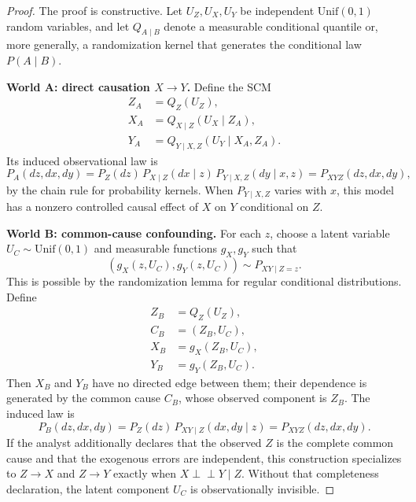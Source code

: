 \documentclass[12pt,a4paper]{article}
\begin{document}
\begin{proof}
\rigorFull
The proof is constructive.  Let $U_Z,U_X,U_Y$ be independent
$\mathrm{Unif}(0,1)$ random variables, and let
$Q_{A\mid B}$ denote a measurable conditional quantile or, more generally,
a randomization kernel that generates the conditional law $P(A\mid B)$.

\medskip\noindent
\textbf{World A: direct causation $X \to Y$.}
Define the SCM
\begin{align}
    Z_A &= Q_Z(U_Z), \nonumber\\
    X_A &= Q_{X\mid Z}(U_X \mid Z_A), \nonumber\\
    Y_A &= Q_{Y\mid X,Z}(U_Y \mid X_A,Z_A).
    \label{eq:scm_direct}
\end{align}
Its induced observational law is
\begin{equation}
    P_A(dz,dx,dy)
    = P_Z(dz)\,P_{X\mid Z}(dx\mid z)\,P_{Y\mid X,Z}(dy\mid x,z)
    = P_{XYZ}(dz,dx,dy),
    \label{eq:direct_law}
\end{equation}
by the chain rule for probability kernels.  When
$P_{Y\mid X,Z}$ varies with $x$, this model has a nonzero controlled
causal effect of $X$ on $Y$ conditional on $Z$.

\medskip\noindent
\textbf{World B: common-cause confounding.}
For each $z$, choose a latent variable $U_C \sim \mathrm{Unif}(0,1)$ and
measurable functions $g_X,g_Y$ such that
\begin{equation}
    (g_X(z,U_C),g_Y(z,U_C)) \sim P_{XY\mid Z=z}.
    \label{eq:common_cause_kernel}
\end{equation}
This is possible by the randomization lemma for regular conditional
distributions.  Define
\begin{align}
    Z_B &= Q_Z(U_Z), \nonumber\\
    C_B &= (Z_B,U_C), \nonumber\\
    X_B &= g_X(Z_B,U_C), \nonumber\\
    Y_B &= g_Y(Z_B,U_C).
    \label{eq:scm_confounding}
\end{align}
Then $X_B$ and $Y_B$ have no directed edge between them; their dependence
is generated by the common cause $C_B$, whose observed component is $Z_B$.
The induced law is
\begin{equation}
    P_B(dz,dx,dy)
    = P_Z(dz)\,P_{XY\mid Z}(dx,dy\mid z)
    = P_{XYZ}(dz,dx,dy).
    \label{eq:confounding_law}
\end{equation}
If the analyst additionally declares that the observed $Z$ is the complete
common cause and that the exogenous errors are independent, this construction
specializes to $Z \to X$ and $Z \to Y$ exactly when
$X \perp\!\!\!\perp Y\mid Z$.  Without that completeness declaration, the
latent component $U_C$ is observationally invisible.


\end{proof}
\end{document}
